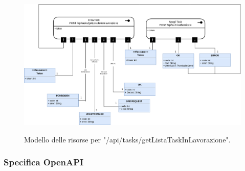 \documentclass{report}
\begin{document}
\begin{figure}[H]
	\centering\includegraphics[width=1\textwidth]{images/model_in_lavorazione.png}

	Modello delle risorse per "/api/tasks/getListaTaskInLavorazione".
\end{figure}

\subsubsection*{Specifica OpenAPI}
\end{document}

